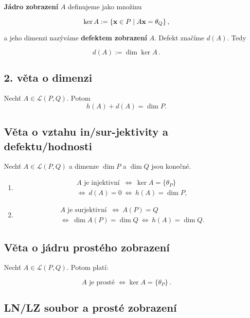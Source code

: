 \noindent \textbf{Jádro zobrazení} $A$ definujeme jako množinu

\[ \ker A:=\{\mathbf{x}\in P\mid A\mathbf{x}=\theta_Q\}\,, \]

\noindent a jeho dimenzi nazýváme \textbf{defektem zobrazení} $A$. Defekt značíme $d(A)$. Tedy

\[ d(A):=\dim \ker A\,. \]

\subsection*{2. věta o dimenzi}

Nechť $A\in\mathcal L(P,Q)$. Potom
\[ h(A)+d(A)=\dim P. \]

\subsection*{Věta o vztahu in/sur-jektivity a defektu/hodnosti}

Nechť $A\in\mathcal L(P,Q)$ a dimenze $\dim P$ a $\dim Q$ jsou konečné.

\begin{enumerate}
      \item \begin{gather*}
                  A \text{ je injektivní } \ \Leftrightarrow\ \ker A=\{\theta_P\}\\
                  \Leftrightarrow\  d(A)=0 \ \Leftrightarrow\  h(A)=\dim P,
            \end{gather*}
      \item \begin{gather*}
                  A \text{ je surjektivní }\ \Leftrightarrow\ A(P)=Q \\
                  \Leftrightarrow\ \dim A(P)=\dim Q \ \Leftrightarrow\ h(A)=\dim Q.
            \end{gather*}
\end{enumerate}

\subsection*{Věta o jádru prostého zobrazení}

Nechť $A\in\mathcal L(P,Q)$. Potom platí:

\[ A\text{ je prosté }\Leftrightarrow \ker A=\{\theta_P\}\,. \]

\subsection*{LN/LZ soubor a prosté zobrazení}


